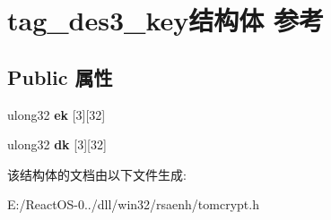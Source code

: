 \hypertarget{structtag__des3__key}{}\section{tag\+\_\+des3\+\_\+key结构体 参考}
\label{structtag__des3__key}
\subsection*{Public 属性}
\begin{DoxyCompactItemize}
\item 
\mbox{\label{structtag__des3__key_aa73b3514c2cc04f782889ba82f4db3dd}} 
ulong32 {\bfseries ek} \mbox{[}3\mbox{]}\mbox{[}32\mbox{]}
\item 
\mbox{\label{structtag__des3__key_a7d263e5e5a6b45fe42b267c285563b85}} 
ulong32 {\bfseries dk} \mbox{[}3\mbox{]}\mbox{[}32\mbox{]}
\end{DoxyCompactItemize}


该结构体的文档由以下文件生成\+:\begin{DoxyCompactItemize}
\item 
E\+:/\+React\+O\+S-\/0../dll/win32/rsaenh/tomcrypt.\+h\end{DoxyCompactItemize}

